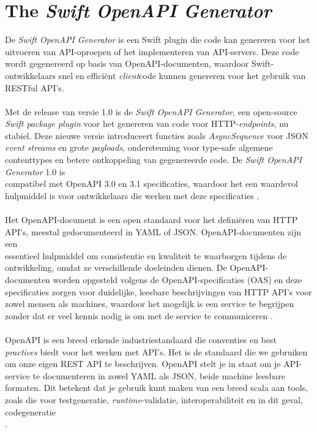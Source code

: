 \section{The \textit{Swift OpenAPI Generator}}
De \textit{Swift OpenAPI Generator} is een Swift plugin die code kan genereren voor het \\uitvoeren van API-oproepen of het implementeren van API-servers. Deze code wordt gegenereerd op basis van OpenAPI-documenten, waardoor Swift-ontwikkelaars snel en efficiënt \textit{client}code kunnen genereren voor het gebruik van RESTful API's.
 \\  \\
Met de release van versie 1.0 is de \textit{Swift OpenAPI Generator}, een open-source \textit{Swift package plugin} voor het genereren van code voor HTTP-\textit{endpoints}, nu stabiel. Deze nieuwe versie introduceert functies zoals \textit{AsyncSequence} voor JSON \textit{event streams} en grote \textit{payloads}, ondersteuning voor type-safe algemene contenttypes en betere ontkoppeling van gegenereerde code. De \textit{Swift OpenAPI Generator} 1.0 is \\compatibel met OpenAPI 3.0 en 3.1 specificaties, waardoor het een waardevol hulpmiddel is voor ontwikkelaars die werken met deze specificaties \autocite{Simone2024}. 
 \\  \\
Het OpenAPI-document is een open standaard voor het definiëren van HTTP API's, meestal gedocumenteerd in YAML of JSON. OpenAPI-documenten zijn een \\essentieel hulpmiddel om consistentie en kwaliteit te waarborgen tijdens de \\ontwikkeling, omdat ze verschillende doeleinden dienen. De OpenAPI-documenten worden opgesteld volgens de OpenAPI-specificaties (OAS) en deze specificaties zorgen voor duidelijke, leesbare beschrijvingen van HTTP API's voor zowel mensen als machines, waardoor het mogelijk is een service te begrijpen zonder dat er veel kennis nodig is om met de service te communiceren \autocite{Miller2020}.
 \\  \\
OpenAPI is een breed erkende industriestandaard die conventies en best \\\textit{practices} biedt voor het werken met API's. Het is de standaard die we gebruiken om onze eigen REST API te beschrijven. OpenAPI stelt je in staat om je API-service te documenteren in zowel YAML als JSON, beide machine leesbare formaten. Dit betekent dat je gebruik kunt maken van een breed scala aan tools, zoals die voor testgeneratie, \textit{runtime}-validatie, interoperabiliteit en in dit geval, codegeneratie \\\autocite{Simone2024}. 

